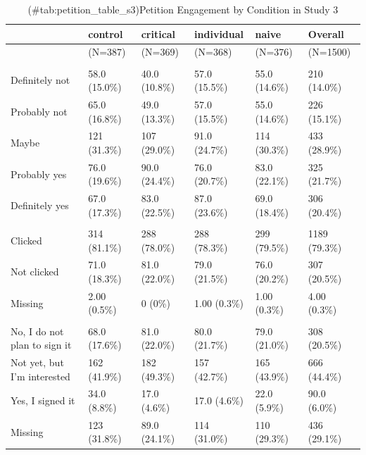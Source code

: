 \documentclass[
]{book}
\begin{document}
\begin{table}

\caption{(\#tab:petition_table_s3)Petition Engagement by Condition in Study 3}
\centering
\begin{tabular}[t]{llllll}
\toprule
  & control & critical & individual & naive & Overall\\
\midrule
 & (N=387) & (N=369) & (N=368) & (N=376) & (N=1500)\\
\addlinespace[0.3em]
\multicolumn{6}{l}{\textbf{Interest in signing community-led petition}}\\
\hspace{1em}Definitely not & 58.0 (15.0\%) & 40.0 (10.8\%) & 57.0 (15.5\%) & 55.0 (14.6\%) & 210 (14.0\%)\\
\hspace{1em}Probably not & 65.0 (16.8\%) & 49.0 (13.3\%) & 57.0 (15.5\%) & 55.0 (14.6\%) & 226 (15.1\%)\\
\hspace{1em}Maybe & 121 (31.3\%) & 107 (29.0\%) & 91.0 (24.7\%) & 114 (30.3\%) & 433 (28.9\%)\\
\hspace{1em}Probably yes & 76.0 (19.6\%) & 90.0 (24.4\%) & 76.0 (20.7\%) & 83.0 (22.1\%) & 325 (21.7\%)\\
\hspace{1em}Definitely yes & 67.0 (17.3\%) & 83.0 (22.5\%) & 87.0 (23.6\%) & 69.0 (18.4\%) & 306 (20.4\%)\\
\addlinespace[0.3em]
\multicolumn{6}{l}{\textbf{Petition clicked}}\\
\hspace{1em}Clicked & 314 (81.1\%) & 288 (78.0\%) & 288 (78.3\%) & 299 (79.5\%) & 1189 (79.3\%)\\
\hspace{1em}Not clicked & 71.0 (18.3\%) & 81.0 (22.0\%) & 79.0 (21.5\%) & 76.0 (20.2\%) & 307 (20.5\%)\\
\hspace{1em}Missing & 2.00 (0.5\%) & 0 (0\%) & 1.00 (0.3\%) & 1.00 (0.3\%) & 4.00 (0.3\%)\\
\addlinespace[0.3em]
\multicolumn{6}{l}{\textbf{Signed petition}}\\
\hspace{1em}No, I do not plan to sign it & 68.0 (17.6\%) & 81.0 (22.0\%) & 80.0 (21.7\%) & 79.0 (21.0\%) & 308 (20.5\%)\\
\hspace{1em}Not yet, but I'm interested & 162 (41.9\%) & 182 (49.3\%) & 157 (42.7\%) & 165 (43.9\%) & 666 (44.4\%)\\
\hspace{1em}Yes, I signed it & 34.0 (8.8\%) & 17.0 (4.6\%) & 17.0 (4.6\%) & 22.0 (5.9\%) & 90.0 (6.0\%)\\
\hspace{1em}Missing & 123 (31.8\%) & 89.0 (24.1\%) & 114 (31.0\%) & 110 (29.3\%) & 436 (29.1\%)\\
\bottomrule
\end{tabular}
\end{table}
\end{document}
